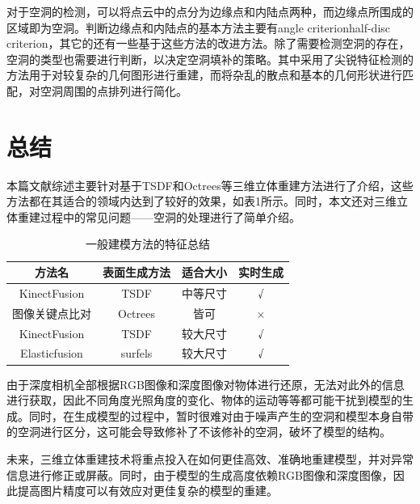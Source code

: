 \documentclass{llncs}
\begin{document}
\begin{CJK}{UTF8}{song}
对于空洞的检测，可以将点云中的点分为边缘点和内陆点两种，而边缘点所围成的区域即为空洞。判断边缘点和内陆点的基本方法主要有angle criterion\cite{DBLP:journals/jwscg/BendelsSK06}half-disc criterion\cite{DBLP:journals/dm/WagnerW09}，其它的还有一些基于这些方法的改进方法\cite{DBLP:conf/mm/ZhangW12}。除了需要检测空洞的存在，空洞的类型也需要进行判断，以决定空洞填补的策略。其中\cite{DBLP:conf/smi/WeberHH10}采用了尖锐特征检测的方法用于对较复杂的几何图形进行重建，而\cite{Tran2015Extraction}将杂乱的散点和基本的几何形状进行匹配，对空洞周围的点排列进行简化。


\section{总结}

本篇文献综述主要针对基于TSDF和Octrees等三维立体重建方法进行了介绍，这些方法都在其适合的领域内达到了较好的效果，如表1所示。同时，本文还对三维立体重建过程中的常见问题——空洞的处理进行了简单介绍。

\begin{table}
\label{sum}
\caption{一般建模方法的特征总结}
\centering
\begin{tabular}{cccc}
\toprule
\textbf{方法名}& \textbf{表面生成方法}& \textbf{适合大小}& \textbf{实时生成}\\
\midrule
KinectFusion& TSDF& 中等尺寸& √\\
图像关键点比对& Octrees& 皆可& ×\\
KinectFusion& TSDF& 较大尺寸& √\\
Elasticfusion& surfels& 较大尺寸& √\\
\bottomrule
\end{tabular}
\end{table}

由于深度相机全部根据RGB图像和深度图像对物体进行还原，无法对此外的信息进行获取，因此不同角度光照角度的变化、物体的运动等等都可能干扰到模型的生成。同时，在生成模型的过程中，暂时很难对由于噪声产生的空洞和模型本身自带的空洞进行区分，这可能会导致修补了不该修补的空洞，破坏了模型的结构。

未来，三维立体重建技术将重点投入在如何更佳高效、准确地重建模型，并对异常信息进行修正或屏蔽。同时，由于模型的生成高度依赖RGB图像和深度图像，因此提高图片精度可以有效应对更佳复杂的模型的重建。


%

\end{CJK}
\end{document}
